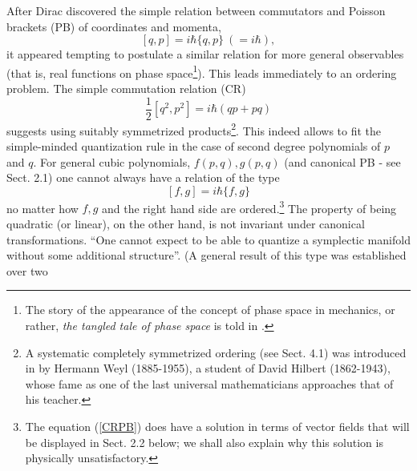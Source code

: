 After Dirac discovered the simple relation between commutators and Poisson brackets
(PB) of coordinates and momenta,
\begin{equation}
\label{qp}
[q, p] = i\hbar \{q, p\}\ (= i\hbar),
\end{equation}
it appeared tempting to postulate a similar relation for more general observables (that is, real functions on 
phase space\footnote{The story of the appearance of the concept of phase space in mechanics, 
or rather, {\it the tangled tale of phase space} is told in \cite{N}.}). This leads immediately to an ordering
problem. The simple commutation relation (CR)
\begin{equation}
\label{quadr}
 \frac{1}{2} [q^2, p^2] = i\hbar (qp + pq)
\end{equation}
suggests using suitably symmetrized products\footnote{A systematic completely 
symmetrized ordering (see Sect. 4.1) was introduced in \cite{We} by Hermann Weyl (1885-1955), 
a student of David Hilbert (1862-1943), whose fame as one of the last universal 
mathematicians approaches that of his teacher.}. This indeed allows to fit the simple-minded 
quantization rule in the case of second degree polynomials of $p$ and $q$. For general cubic 
polynomials, $f(p, q), g(p,q)$ (and canonical PB - see Sect. 2.1) one cannot always have a 
relation of the type
\begin{equation}
\label{CRPB}
[f, g] = i \hbar \{f, g\}
\end{equation}
no matter how $f, g$ and the right hand side are ordered.\footnote{The equation
(\ref{CRPB}) does have a solution in terms of vector fields that will be
displayed in Sect. 2.2 below; we shall also explain why this solution is
physically unsatisfactory.}  The property of being quadratic (or linear), on the
 other hand, is not invariant under canonical transformations. ``One cannot
expect to be able to quantize a symplectic manifold without some additional
structure''\cite{GW}. (A general result of this type was established over two
